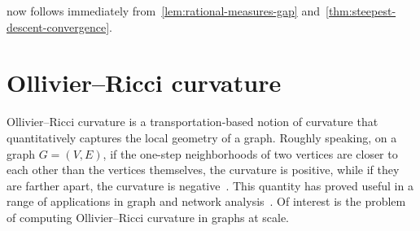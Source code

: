\documentclass[11pt,a4paper]{article}
\newcommand{\prob}{{\mathscr{P}}}
\newcommand{\wass}{{\mathcal{W}}}
\newcommand{\setoftrees}{{\mathcal{T}}}
\begin{document}
%     
%

 now follows immediately from~\cref{lem:rational-measures-gap} and~\cref{thm:steepest-descent-convergence}.

\section{Ollivier--Ricci curvature}\label{sec:ollivier-ricci-curvature}

Ollivier--Ricci curvature is a transportation-based notion of curvature that quantitatively captures the local geometry of a graph. Roughly speaking, on a graph $G=(V,E)$, if the one-step neighborhoods of two vertices are closer to each other than the vertices themselves, the curvature is positive, while if they are farther apart, the curvature is negative~\cite{ollivier2009ricci}. This quantity has proved useful in a range of applications in graph and network analysis~\cite{tian2025curvature}. Of interest is the problem of computing Ollivier--Ricci curvature in graphs at scale.
\end{document}
